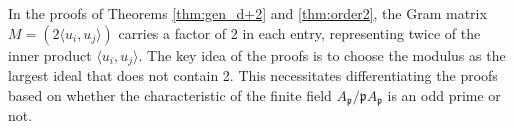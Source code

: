 \documentclass[a4paper, 11pt]{article}
\newcommand{\Z}{\mathbb{Z}}
\newcommand{\p}{\mathfrak{p}}
\newcommand{\la}{\langle}
\newcommand{\ra}{\rangle}
\theoremstyle{definition}
\begin{document}

In the proofs of Theorems \ref{thm:gen_d+2} and \ref{thm:order2}, the Gram matrix $M=(2\langle u_i,u_j \rangle)$ carries a factor of $2$ in each entry, representing twice of the inner product $\langle u_i,u_j\rangle$. 
The key idea of the proofs is to choose the modulus as the largest ideal that does not contain 2.  
This necessitates differentiating the proofs based on whether the characteristic of the finite field $A_\p/\p A_\p$ is an odd prime or not.
\end{document}
